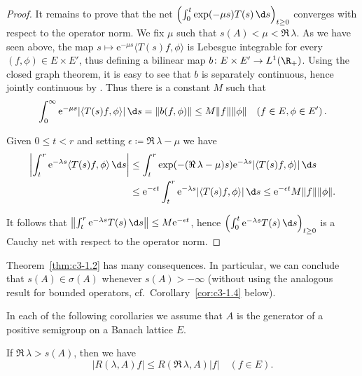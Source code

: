 \begin{proof}
It remains to prove that the net $\left(\int_{0}^t \exp(-\mu s)T(s) \,\d s\right)_{t\geq 0}$ converges with respect to the operator norm.
We fix $\mu$ such that $s(A) < \mu < \Re\, \lambda$.
As we have seen above, the map $s \mapsto \mathrm{e}^{-\mu s}\langle T(s)f,\phi\rangle$ is Lebesgue integrable for every $(f,\phi) \in E \times E'$, thus defining a bilinear map $b \colon E \times E' \to L^1(\R _{+})$.
Using the closed graph theorem, it is easy to see that $b$ is separately continuous, hence jointly continuous by \citet[III.Theorem~5.1]{schaefer:1966}.
Thus there is a constant $M$ such that
\begin{equation}\label{eq:c3-1.4}
	\int_{0}^{\infty} \mathrm{e}^{-\mu s}|\langle T(s)f,\phi\rangle| \,\d s = \|b(f,\phi)\| \leq M\|f\|\|\phi\| \quad (f \in E, \phi \in E')\,.
\end{equation}

Given $0 \leq t < r$ and setting $\epsilon \coloneqq \Re\, \lambda - \mu$ we have
\begin{align*}
	\left|\int_{t}^r \mathrm{e}^{-\lambda s}\langle T(s)f,\phi\rangle \,\d s\right| &\leq \int_{t}^r \exp(-(\Re\,\lambda-\mu)s)\mathrm{e}^{-\lambda s}|\langle T(s)f,\phi\rangle| \,\d s \\
	&\leq \mathrm{e}^{-\epsilon t}\int_{t}^r \mathrm{e}^{-\lambda s}|\langle T(s)f,\phi\rangle| \,\d s \leq \mathrm{e}^{-\epsilon t} M\|f\|\|\phi\|.
\end{align*}

It follows that $\left\|\int_{t}^r \mathrm{e}^{-\lambda s}T(s) \,\d s\right\| \leq M\mathrm{e}^{-\epsilon t}$, hence $\left(\int_{0}^t \mathrm{e}^{-\lambda s}T(s) \,\d s\right)_{t\geq 0}$ is a Cauchy net with respect to the operator norm.
\end{proof}

Theorem~\ref{thm:c3-1.2} has many consequences.
In particular, we can conclude that $s(A) \in \sigma(A)$ whenever $s(A) > -\infty$ (without using the analogous result for bounded operators, cf.\ Corollary~\ref{cor:c3-1.4} below).

In each of the following corollaries we assume that $A$ is the generator of a positive semigroup on a Banach lattice $E$.

\begin{corollary}\label{cor:c3-1.3}
If $\Re\, \lambda > s(A)$, then we have
\begin{equation}\label{eq:c3-1.5}
	|R(\lambda,A)f| \leq R(\Re\,\lambda,A) |f| \quad (f \in E).
\end{equation}
\end{corollary}

